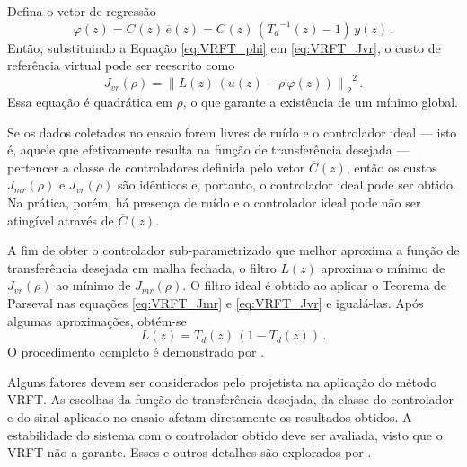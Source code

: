 \documentclass[repeatfields,oneside,overleaf]{tcc}
\newcommand{\mycdot}{ \, }
\newcommand{\myoC}[2][]{ \overline{C_{#1}} \left( #2 \right) }
\begin{document}
Defina o vetor de regressão
\begin{equation}\label{eq:VRFT_phi}
    \varphi(z) = \myoC{z} \mycdot \overline{e}(z) = \myoC{z} \mycdot \left( {T_d}^{-1}(z) - 1 \right) \mycdot y(z)
    \,.
\end{equation}
Então, substituindo a Equação \eqref{eq:VRFT_phi} em \eqref{eq:VRFT_Jvr}, o custo de referência virtual pode ser reescrito como
\begin{equation}\label{eq:VRFT_Jvr_2}
    J_{vr} \left( \rho \right)
    = {\left\lVert L(z) \mycdot \left( u(z) - \rho \mycdot \varphi(z) \right) \right\rVert_2}^2
    \,.
\end{equation}
Essa equação é quadrática em $\rho$, o que garante a existência de um mínimo global.

Se os dados coletados no ensaio forem livres de ruído e o controlador ideal --- isto é, aquele que efetivamente resulta na função de transferência desejada --- pertencer a classe de controladores definida pelo vetor $\myoC[]{z}$, então os custos $J_{mr}(\rho)$ e $J_{vr}(\rho)$ são idênticos e, portanto, o controlador ideal pode ser obtido.
Na prática, porém, há presença de ruído e o controlador ideal pode não ser atingível através de $\myoC[]{z}$.

A fim de obter o controlador sub-parametrizado que melhor aproxima a função de transferência desejada em malha fechada, o filtro $L(z)$ aproxima o mínimo de $J_{vr}(\rho)$ ao mínimo de $J_{mr}(\rho)$.
O filtro ideal é obtido ao aplicar o Teorema de Parseval nas equações \eqref{eq:VRFT_Jmr} e \eqref{eq:VRFT_Jvr} e igualá-las.
Após algumas aproximações, obtém-se
\begin{equation}\label{eq:VRFT_L}
    L(z) = T_d(z) \mycdot \left( 1 - T_d(z) \right)
    \,.
\end{equation}
O procedimento completo é demonstrado por \textcite{Campi2000, Bazanella2011}.

Alguns fatores devem ser considerados pelo projetista na aplicação do método VRFT.
As escolhas da função de transferência desejada, da classe do controlador e do sinal aplicado no ensaio afetam diretamente os resultados obtidos.
A estabilidade do sistema com o controlador obtido deve ser avaliada, visto que o VRFT não a garante.
Esses e outros detalhes são explorados por \textcite{Bazanella2011}.
\end{document}
